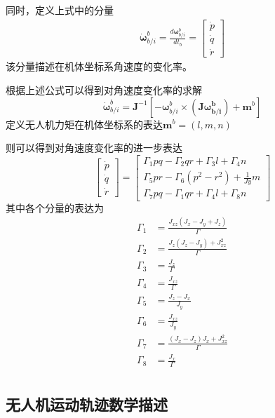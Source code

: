 同时，定义上式中的分量
\begin{align}
\dot{\mathbf{\omega}}^b_{b/i}=\frac{ d \mathbf{\omega}^b_{b/i}}{dt_b} = \begin{bmatrix} \dot{p} \\ \dot{q} \\ \dot{r}  \end{bmatrix}
\end{align}
该分量描述在机体坐标系角速度的变化率。

根据上述公式可以得到对角速度变化率的求解
\begin{equation}
\dot{\mathbf{\omega}}^b_{b/i} = \mathbf{J}^{-1}[{- \mathbf{\omega}}^b_{b/i} \times (\mathbf{J{\mathbf{\omega}}^b_{b/i}})+\mathbf{m}^b]
\end{equation}
定义无人机力矩在机体坐标系的表达$\mathbf{m}^b = (l, m, n)$

则可以得到对角速度变化率的进一步表达
\begin{equation}
\begin{bmatrix} \dot{p} \\ \dot{q} \\ \dot{r}  \end{bmatrix} =  \begin{bmatrix} \Gamma_1pq - \Gamma_2qr + \Gamma_3 l + \Gamma_4 n \\ \Gamma_5pr - \Gamma_6(p^2-r^2) + \frac{1}{Jy}m \\ \Gamma_7pq - \Gamma_1qr + \Gamma_4l + \Gamma_8 n  \end{bmatrix}
\end{equation}
其中各个分量的表达为
\begin{align}
\Gamma_1 &= \frac{J_{xz}(J_x-J_y+J_z)}{\Gamma}  \\
\Gamma_2 &= \frac{J_z(J_z-J_y) + J_{xz}^2}{\Gamma}  \\
\Gamma_3 &= \frac{J_z}{\Gamma}  \\
\Gamma_4 &= \frac{J_{xz}}{\Gamma}  \\
\Gamma_5 &= \frac{J_z - J_x}{J_y}  \\
\Gamma_6 &= \frac{J_{xz}}{J_y}  \\
\Gamma_7 &= \frac{(J_x-J_z)J_x+J_{xz}^2}{\Gamma}  \\
\Gamma_8 &= \frac{J_x}{\Gamma}  \\
\end{align}
 
\subsection{无人机运动轨迹数学描述}

